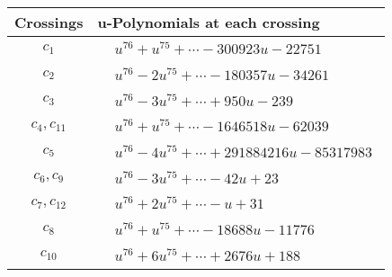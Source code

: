 \documentclass[1p]{elsarticle_modified}
\theoremstyle{definition}
\begin{document}
\begin{tabular}{m{50pt}|m{274pt}}
Crossings & \hspace{64pt}u-Polynomials at each crossing \\
\hline $$\begin{aligned}c_{1}\end{aligned}$$&$\begin{aligned}
&u^{76}+u^{75}+\cdots-300923 u-22751
\end{aligned}$\\
\hline $$\begin{aligned}c_{2}\end{aligned}$$&$\begin{aligned}
&u^{76}-2 u^{75}+\cdots-180357 u-34261
\end{aligned}$\\
\hline $$\begin{aligned}c_{3}\end{aligned}$$&$\begin{aligned}
&u^{76}-3 u^{75}+\cdots+950 u-239
\end{aligned}$\\
\hline $$\begin{aligned}c_{4},c_{11}\end{aligned}$$&$\begin{aligned}
&u^{76}+u^{75}+\cdots-1646518 u-62039
\end{aligned}$\\
\hline $$\begin{aligned}c_{5}\end{aligned}$$&$\begin{aligned}
&u^{76}-4 u^{75}+\cdots+291884216 u-85317983
\end{aligned}$\\
\hline $$\begin{aligned}c_{6},c_{9}\end{aligned}$$&$\begin{aligned}
&u^{76}-3 u^{75}+\cdots-42 u+23
\end{aligned}$\\
\hline $$\begin{aligned}c_{7},c_{12}\end{aligned}$$&$\begin{aligned}
&u^{76}+2 u^{75}+\cdots- u+31
\end{aligned}$\\
\hline $$\begin{aligned}c_{8}\end{aligned}$$&$\begin{aligned}
&u^{76}+u^{75}+\cdots-18688 u-11776
\end{aligned}$\\
\hline $$\begin{aligned}c_{10}\end{aligned}$$&$\begin{aligned}
&u^{76}+6 u^{75}+\cdots+2676 u+188
\end{aligned}$\\
\hline
\end{tabular}\\~\\
\end{document}
